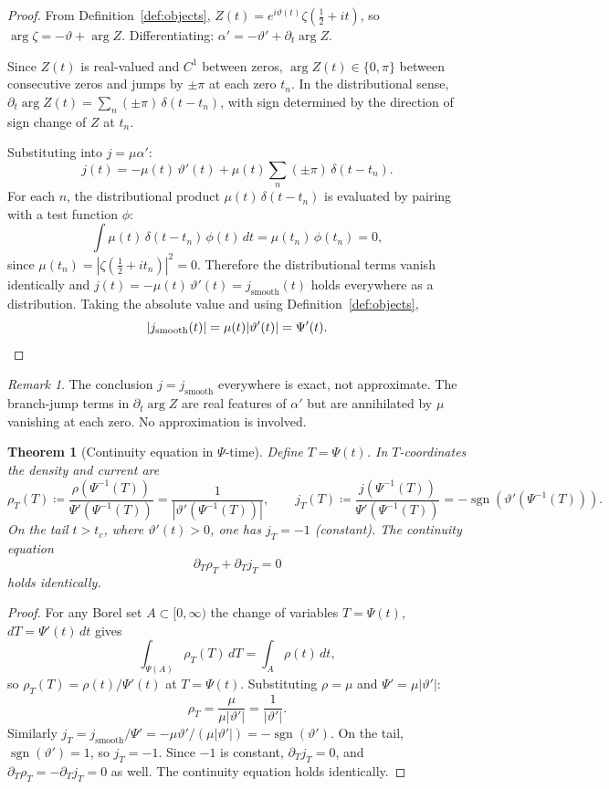\documentclass[11pt]{article}
\theoremstyle{plain}
\newtheorem{theorem}{Theorem}
\theoremstyle{definition}
\theoremstyle{remark}
\newtheorem*{remark}{Remark}
\begin{document}
\begin{proof}
From Definition~\ref{def:objects}, $Z(t) = e^{i\vartheta(t)}\zeta(\tfrac{1}{2}+it)$,
so $\arg\zeta = -\vartheta + \arg Z$. Differentiating: $\alpha' =
-\vartheta' + \partial_t\arg Z$.

Since $Z(t)$ is real-valued and $C^1$ between zeros, $\arg Z(t) \in
\{0,\pi\}$ between consecutive zeros and jumps by $\pm\pi$ at each
zero $t_n$. In the distributional sense,
$\partial_t\arg Z(t) = \sum_n (\pm\pi)\,\delta(t-t_n)$, with
sign determined by the direction of sign change of $Z$ at $t_n$.

Substituting into $j = \mu\alpha'$:
\[
j(t) = -\mu(t)\,\vartheta'(t) + \mu(t)\sum_n(\pm\pi)\,\delta(t-t_n).
\]
For each $n$, the distributional product $\mu(t)\,\delta(t-t_n)$ is
evaluated by pairing with a test function $\phi$:
\[
\int \mu(t)\,\delta(t-t_n)\,\phi(t)\,dt = \mu(t_n)\,\phi(t_n) = 0,
\]
since $\mu(t_n) = |\zeta(\tfrac{1}{2}+it_n)|^2 = 0$. Therefore the
distributional terms vanish identically and
$j(t) = -\mu(t)\,\vartheta'(t) = j_{\mathrm{smooth}}(t)$ holds
everywhere as a distribution. Taking the absolute value and using
Definition~\ref{def:objects},
\[
|j_{\mathrm{smooth}}(t)| = \mu(t)|\vartheta'(t)| = \Psi'(t).\qedhere
\]
\end{proof}

\begin{remark}
The conclusion $j = j_{\mathrm{smooth}}$ everywhere is exact, not
approximate. The branch-jump terms in $\partial_t\arg Z$ are real
features of $\alpha'$ but are annihilated by $\mu$ vanishing at each
zero. No approximation is involved.
\end{remark}

\begin{theorem}[Continuity equation in $\Psi$-time]
\label{thm:continuity}
Define $T = \Psi(t)$. In $T$-coordinates the density and current are
\[
\rho_T(T) \coloneqq \frac{\rho(\Psi^{-1}(T))}{\Psi'(\Psi^{-1}(T))}
= \frac{1}{|\vartheta'(\Psi^{-1}(T))|},
\qquad
j_T(T) \coloneqq \frac{j(\Psi^{-1}(T))}{\Psi'(\Psi^{-1}(T))}
= -\operatorname{sgn}(\vartheta'(\Psi^{-1}(T))).
\]
On the tail $t > t_c$, where $\vartheta'(t) > 0$, one has $j_T = -1$
(constant). The continuity equation
\[
\partial_T\rho_T + \partial_T j_T = 0
\]
holds identically.
\end{theorem}

\begin{proof}
For any Borel set $A \subset [0,\infty)$ the change of variables
$T = \Psi(t)$, $dT = \Psi'(t)\,dt$ gives
\[
\int_{\Psi(A)}\rho_T(T)\,dT = \int_A \rho(t)\,dt,
\]
so $\rho_T(T) = \rho(t)/\Psi'(t)$ at $T = \Psi(t)$. Substituting
$\rho = \mu$ and $\Psi' = \mu|\vartheta'|$:
\[
\rho_T = \frac{\mu}{\mu|\vartheta'|} = \frac{1}{|\vartheta'|}.
\]
Similarly $j_T = j_{\mathrm{smooth}}/\Psi' = -\mu\vartheta'/(\mu|\vartheta'|) =
-\operatorname{sgn}(\vartheta')$. On the tail, $\operatorname{sgn}(\vartheta')=1$,
so $j_T = -1$. Since $-1$ is constant, $\partial_T j_T = 0$, and
$\partial_T\rho_T = -\partial_T j_T = 0$ as well. The continuity
equation holds identically.
\end{proof}
\end{document}
